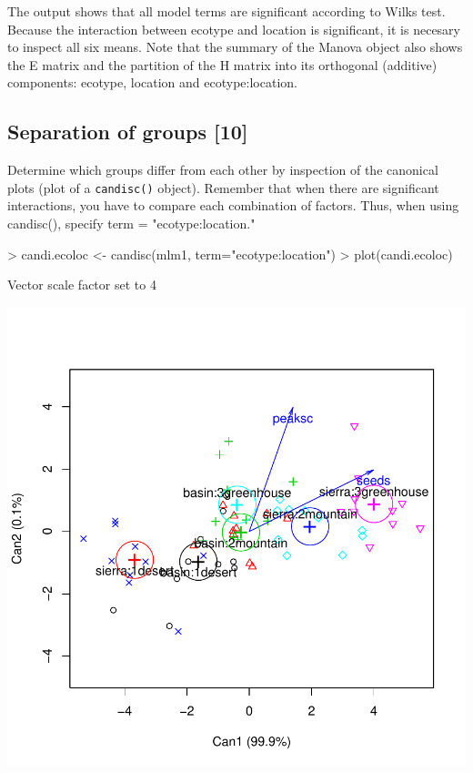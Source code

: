 \documentclass{article}
\begin{document}
The output shows that all model terms are significant according to Wilks test. Because the interaction between ecotype and location is significant, it is necesary to inspect all six means. Note that the summary of the Manova object also shows the E matrix and the partition of the H matrix into its orthogonal (additive) components: ecotype, location and ecotype:location.

\subsection{Separation of groups [10]}

Determine which groups differ from each other by inspection of the canonical plots (plot of a \verb!candisc()! object). Remember that when there are significant interactions, you have to compare each combination of factors. Thus, when using candisc(), specify term = "ecotype:location."

\begin{Schunk}
\begin{Sinput}
> candi.ecoloc <- candisc(mlm1, term="ecotype:location")
> plot(candi.ecoloc)
\end{Sinput}
\begin{Soutput}
Vector scale factor set to  4 
\end{Soutput}
\end{Schunk}
\includegraphics{HW09MANOVA_DA-007}
\end{document}
